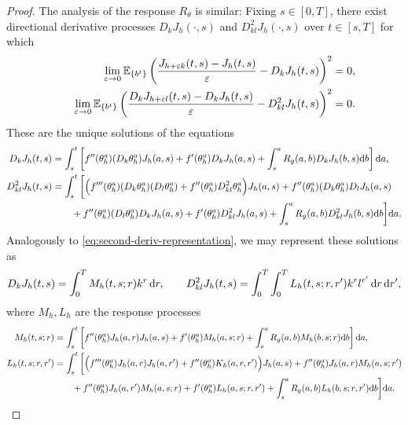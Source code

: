 \begin{proof}
The analysis of the response $R_\theta$ is similar: Fixing $s \in [0,T]$,
there exist directional derivative processes
$D_kJ_h(\cdot,s)$
and $D_{kl}^2J_h(\cdot,s)$ over $t \in [s,T]$ for which
\begin{align*}
\lim_{\varepsilon \to 0}
\mathbb{E}_{\{b^t\}}\left(\frac{J_{h+\varepsilon k}(t,s)-J_h(t,s)}{\varepsilon}
-D_kJ_h(t,s)\right)^2&=0,\\
\qquad \lim_{\varepsilon \to 0}
\mathbb{E}_{\{b^t\}}\left(\frac{D_kJ_{h+\varepsilon l}(t,s)-D_kJ_h(t,s)}{\varepsilon}
-D_{kl}^2J_h(t,s)\right)^2&=0.
\end{align*}
These are the unique solutions of the equations
\begin{align*}
D_kJ_h(t,s)
    &=
    \int_s^t
    \left[
        f''(\theta_h^a)(D_k\theta_h^a)J_h(a,s)
        +
        f'(\theta_h^a)D_kJ_h(a,s)
        +
        \int_s^a R_g(a,b)D_kJ_h(b,s)\mathrm{d} b
    \right]\mathrm{d} a,\\
    D_{kl}^2J_h(t,s)
    &=
    \int_s^t
    \bigg[
        \Bigl(
            f'''(\theta_h^a)(D_k\theta_h^a)(D_l\theta_h^a)
            +
            f''(\theta_h^a)D_{kl}^2\theta_h^a
        \Bigr)J_h(a,s)
        +
        f''(\theta_h^a)(D_k\theta_h^a)D_lJ_h(a,s)
        \\
        &\qquad
        +
        f''(\theta_h^a)(D_l\theta_h^a)D_kJ_h(a,s)
                +
        f'(\theta_h^a)D_{kl}^2J_h(a,s)
        +
        \int_s^a R_g(a,b) D_{kl}^2J_h(b,s) \mathrm{d} b
    \bigg]\mathrm{d} a .
\end{align*}
Analogously to \eqref{eq:second-deriv-representation},
we may represent these solutions as
\[
    D_kJ_h(t,s)
    =
    \int_0^T M_h(t,s;r)k^r\,\mathrm{d} r,\qquad
    D_{kl}^2J_h(t,s)
    =
    \int_0^T\int_0^T
    L_h(t,s;r,r')k^rl^{r'}\,\mathrm{d} r\,\mathrm{d} r',
\]
where $M_h,L_h$ are the response processes
\begin{align*}
M_h(t,s;r)
    &=
    \int_s^t
    \left[
        f''(\theta_h^a)J_h(a,r)J_h(a,s)
        +
        f'(\theta_h^a)M_h(a,s;r)
        +
        \int_s^a R_g(a,b)M_h(b,s;r)\mathrm{d} b
    \right]\mathrm{d} a,\\
    L_h(t,s;r,r')
    &=
    \int_s^t
    \bigg[
        \Bigl(
            f'''(\theta_h^a)J_h(a,r)J_h(a,r')
            +
            f''(\theta_h^a)K_h(a,r,r')
        \Bigr)J_h(a,s)
        +
        f''(\theta_h^a)J_h(a,r)M_h(a,s;r')
        \\
        &\qquad
        +
        f''(\theta_h^a)J_h(a,r')M_h(a,s;r)
        +
        f'(\theta_h^a)L_h(a,s;r,r')
        +
        \int_s^a R_g(a,b)L_h(b,s;r,r')\mathrm{d} b
    \bigg]\mathrm{d} a.
\end{align*}

\end{proof}
